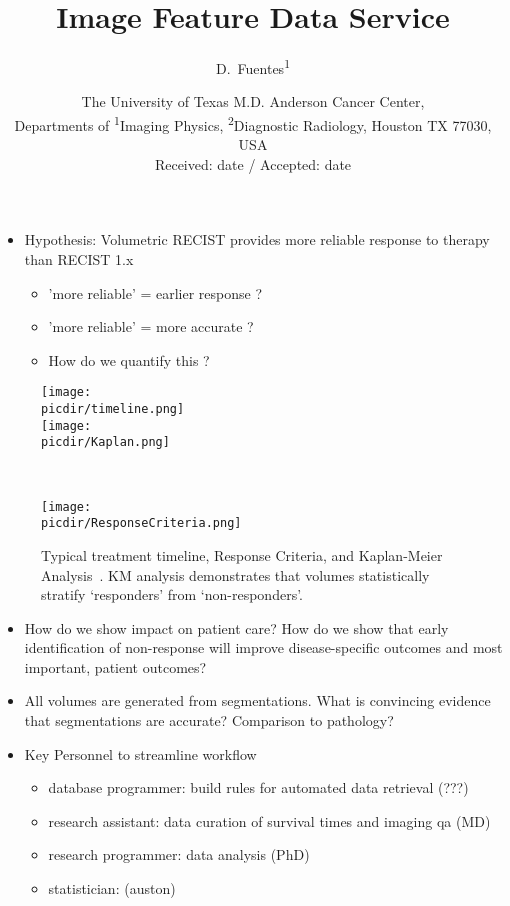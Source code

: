 \documentclass[10pt]{amsart}
\title{Image Feature Data Service}
\author{
        D.~Fuentes\textsuperscript{1} 
}
\date{ \small
The University of Texas M.D. Anderson Cancer Center,\\
Departments of \textsuperscript{1}Imaging Physics, \textsuperscript{2}Diagnostic Radiology,
Houston TX 77030, USA \\
Received: date / Accepted: date
}
\newcommand{\picdir}{./pdffig}
\begin{document}
\maketitle

\begin{itemize}
  \item Hypothesis: Volumetric RECIST\cite{tacher2015comparison} provides
more reliable response to therapy than RECIST 1.x 
    \begin{itemize}
      \item 'more reliable' = earlier response ?
      \item 'more reliable' = more accurate ?  
      \item How do we quantify this ?
    \end{itemize}
\end{itemize}

\begin{figure}[h]
\begin{minipage}{0.7\textwidth}
\texttt{[image: \\picdir/timeline.png]} \\
\texttt{[image: \\picdir/Kaplan.png]}
\end{minipage}~\begin{minipage}{0.39\textwidth}
\texttt{[image: \\picdir/ResponseCriteria.png]}
\end{minipage}
\caption{Typical treatment timeline, Response Criteria, and 
Kaplan-Meier Analysis~\cite{tacher2015comparison}. KM analysis
demonstrates that volumes statistically stratify `responders'
from `non-responders'.
}\label{Fig:Kaplan}
\end{figure}


\begin{itemize}
  \item {\color{red} How do we show impact on patient care? }
   How do we show that early identification of non-response 
   will improve disease-specific outcomes and most important, patient outcomes?
  \item All volumes are generated from segmentations.
        What is convincing evidence that segmentations are accurate?  Comparison to pathology?
\end{itemize}


\clearpage
\pagebreak

\begin{itemize}
  \item Key Personnel to streamline workflow
    \begin{itemize}
     \item database programmer: build rules for automated data retrieval (???)
     \item research assistant: data curation of survival times and imaging qa (MD)
     \item research programmer: data analysis (PhD)
     \item statistician: (auston)
    \end{itemize}
\end{itemize}
\end{document}
